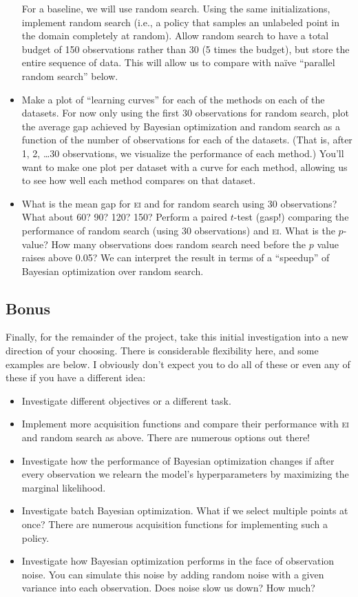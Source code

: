 \documentclass{article}
\newcommand{\acro}[1]{\textsc{\MakeLowercase{#1}}}
\begin{document}
\begin{itemize}
  For a baseline, we will use random search. Using the same initializations,
  implement random search (i.e., a policy that samples an unlabeled point in the
  domain completely at random). Allow random search to have a total budget of
  150 observations rather than 30 (5 times the budget), but store the entire
  sequence of data. This will allow us to compare with na\"ive ``parallel random
  search'' below.
\item
  Make a plot of ``learning curves'' for each of the methods on each of the
  datasets. For now only using the first 30 observations for random search, plot
  the average gap achieved by Bayesian optimization and random search as a
  function of the number of observations for each of the datasets. (That is,
  after 1, 2, \dots 30 observations, we visualize the performance of each
  method.) You'll want to make one plot per dataset with a curve for each
  method, allowing us to see how well each method compares on that dataset.
\item
  What is the mean gap for \acro{EI} and for random search using 30
  observations?  What about 60? 90? 120? 150?  Perform a paired $t$-test (gasp!)
  comparing the performance of random search (using 30 observations) and
  \acro{EI}. What is the $p$-value? How many observations does random search
  need before the $p$ value raises above 0.05? We can interpret the result in
  terms of a ``speedup'' of Bayesian optimization over random search.
\end{itemize}

\subsection*{Bonus}

Finally, for the remainder of the project, take this initial investigation into
a new direction of your choosing. There is considerable flexibility here, and some
examples are below. I obviously don't expect you to do all of these or even any
of these if you have a different idea:
\begin{itemize}
\item
  Investigate different objectives or a different task.
\item
  Implement more acquisition functions and compare their performance with
  \acro{EI} and random search as above. There are numerous options out there!
\item
  Investigate how the performance of Bayesian optimization changes if after
  every observation we relearn the model's hyperparameters by maximizing
  the marginal likelihood.
\item
  Investigate batch Bayesian optimization. What if we select multiple points
  at once? There are numerous acquisition functions for implementing such a policy.
\item
  Investigate how Bayesian optimization performs in the face of observation
  noise.  You can simulate this noise by adding random noise with a given
  variance into each observation. Does noise slow us down? How much?
\end{itemize}
\end{document}
